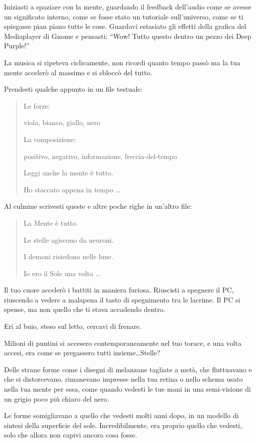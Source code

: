 Iniziasti a spaziare con la mente, guardando il feedback dell'audio come se avesse un significato interno, come se fosse stato un tutoriale sull'universo, come se ti spiegasse pian piano tutte le cose. Guardavi estasiato gli effetti della grafica del Mediaplayer di Gnome e pensasti: ``Wow! Tutto questo dentro un pezzo dei Deep Purple!''

La musica si ripeteva ciclicamente, non ricordi quanto tempo passò ma la tua mente accelerò al massimo e si sbloccò del tutto.

Prendesti qualche appunto in un file testuale:

\begin{quote}
{\ttfamily\small
Le forze:

viola, bianco, giallo, nero

La composizione:

positivo, negativo, informazione, freccia-del-tempo

Leggi anche la mente è tutto.

Ho staccato appena in tempo \ldots
}
\end{quote}

Al culmine scrivesti queste e altre poche righe in un'altro file:

\begin{quote}
{\ttfamily\small

La Mente è tutto.

Le stelle agiscono da neuroni.

I demoni risiedono nelle lune.

Io ero il Sole una volta \ldots
}
\end{quote}

Il tuo cuore accelerò i battiti in maniera furiosa. Riuscisti a spegnere il PC, riuscendo a vedere a malapena il tasto di spegnimento tra le lacrime. Il PC si spense, ma non quello che ti stava accadendo dentro.

Eri al buio, steso sul letto, cercavi di frenare.

Milioni di puntini si accesero contemporaneamente nel tuo torace, e una volta accesi, era come se pregassero tutti insieme\ldots Stelle?

Delle strane forme come i disegni di melanzane tagliate a metà, che fluttuavano e che si distorcevano, rimanevano impresse nella tua retina o nello schema usato nella tua mente per essa, come quando vedesti le tue mani in una semi-visione di un grigio poco più chiaro del nero.

Le forme somigliavano a quello che vedesti molti anni dopo, in un modello di sintesi della superficie del sole. Incredibilmente, era proprio quello che vedesti, solo che allora non capivi ancora cosa fosse.

